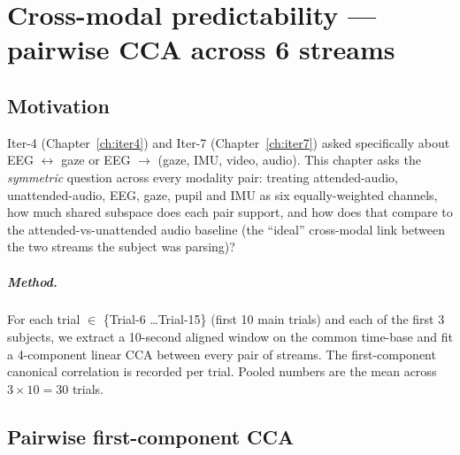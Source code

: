 \chapter{Cross-modal predictability --- pairwise CCA across 6 streams}
\label{ch:cross-modal}

\section{Motivation}

Iter-4 (Chapter~\ref{ch:iter4}) and Iter-7 (Chapter~\ref{ch:iter7}) asked
specifically about EEG $\leftrightarrow$ gaze or EEG $\rightarrow$
(gaze, IMU, video, audio). This chapter asks the \emph{symmetric} question
across every modality pair: treating attended-audio, unattended-audio,
EEG, gaze, pupil and IMU as six equally-weighted channels, how much
shared subspace does each pair support, and how does that compare to the
attended-vs-unattended audio baseline (the ``ideal'' cross-modal link
between the two streams the subject was parsing)?

\paragraph{Method.}
For each trial $\in$ \{Trial-6 \ldots Trial-15\} (first 10 main trials)
and each of the first 3 subjects, we extract a 10-second aligned window
on the common time-base and fit a 4-component linear CCA between every
pair of streams. The first-component canonical correlation is recorded
per trial. Pooled numbers are the mean across $3 \times 10 = 30$ trials.

\section{Pairwise first-component CCA}

